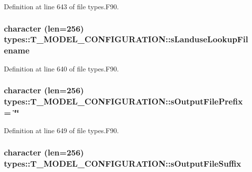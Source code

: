 Definition at line 643 of file types.F90.

\hypertarget{typetypes_1_1_t___m_o_d_e_l___c_o_n_f_i_g_u_r_a_t_i_o_n_a75f2584d98a1e5ea6789c840e12921ea}{
\subsubsection[{sLanduseLookupFilename}]{\setlength{\rightskip}{0pt plus 5cm}character (len=256) {\bf types::T\_\-MODEL\_\-CONFIGURATION::sLanduseLookupFilename}}}
\label{typetypes_1_1_t___m_o_d_e_l___c_o_n_f_i_g_u_r_a_t_i_o_n_a75f2584d98a1e5ea6789c840e12921ea}


Definition at line 640 of file types.F90.

\hypertarget{typetypes_1_1_t___m_o_d_e_l___c_o_n_f_i_g_u_r_a_t_i_o_n_a51840c9e975db1983843253c9e928797}{
\subsubsection[{sOutputFilePrefix}]{\setlength{\rightskip}{0pt plus 5cm}character (len=256) {\bf types::T\_\-MODEL\_\-CONFIGURATION::sOutputFilePrefix} = \char`\"{}\char`\"{}}}
\label{typetypes_1_1_t___m_o_d_e_l___c_o_n_f_i_g_u_r_a_t_i_o_n_a51840c9e975db1983843253c9e928797}


Definition at line 649 of file types.F90.

\hypertarget{typetypes_1_1_t___m_o_d_e_l___c_o_n_f_i_g_u_r_a_t_i_o_n_a1a5446e2c56d0b520a3c3db5e6216b4a}{
\subsubsection[{sOutputFileSuffix}]{\setlength{\rightskip}{0pt plus 5cm}character (len=256) {\bf types::T\_\-MODEL\_\-CONFIGURATION::sOutputFileSuffix}}}
\label{typetypes_1_1_t___m_o_d_e_l___c_o_n_f_i_g_u_r_a_t_i_o_n_a1a5446e2c56d0b520a3c3db5e6216b4a}


